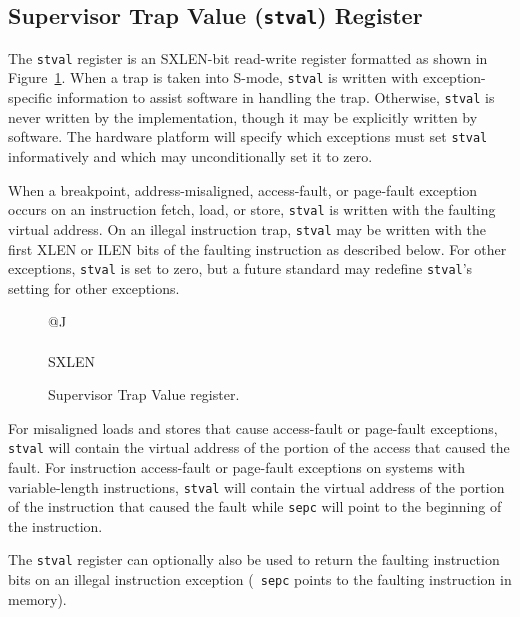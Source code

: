 \subsection{Supervisor Trap Value ({\tt stval}) Register}

The {\tt stval} register is an SXLEN-bit read-write register formatted as shown
in Figure~\ref{stvalreg}.  When a trap is taken into S-mode, {\tt stval} is
written with exception-specific information to assist software in handling the
trap.  Otherwise, {\tt stval} is never written by the implementation, though
it may be explicitly written by software.  The hardware platform will specify
which exceptions must set {\tt stval} informatively and which may
unconditionally set it to zero.


When a breakpoint,
address-misaligned, access-fault, or page-fault exception occurs
on an instruction fetch, load, or store, {\tt stval}
is written with the faulting virtual address.  On an illegal instruction trap,
{\tt stval} may be written with the first XLEN or ILEN bits of the faulting
instruction as described below.  For other exceptions, {\tt stval} is set to
zero, but a future standard may redefine {\tt stval}'s setting for other
exceptions.

\begin{figure}[h!]
{\footnotesize
\begin{center}
\begin{tabular}{@{}J}
 \\
\hline
{} \\
\hline
SXLEN \\
\end{tabular}
\end{center}
}
\vspace{-0.1in}
\caption{Supervisor Trap Value register.}
\label{stvalreg}
\end{figure}

For misaligned loads and stores that cause access-fault or page-fault
exceptions, {\tt stval} will contain the virtual address of the
portion of the access that caused the fault.  For
instruction access-fault or page-fault exceptions on systems
with variable-length instructions, {\tt stval} will contain the
virtual address of the portion of the instruction that caused
the fault while {\tt sepc} will point to the beginning of the
instruction.

The {\tt stval} register can optionally also be used to return the
faulting instruction bits on an illegal instruction exception ({\tt
  sepc} points to the faulting instruction in memory).

